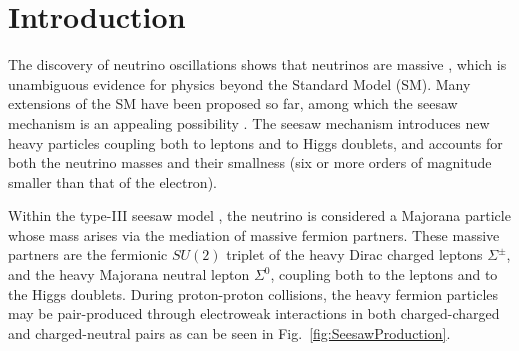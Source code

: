 \chapter{Introduction}
\label{sec:Introduction}

The discovery of neutrino oscillations shows that neutrinos are massive \cite{Nustatus}, which is unambiguous evidence for physics beyond the Standard Model (SM). Many extensions of the SM have been proposed so far, among which the seesaw mechanism is an appealing possibility \cite{SeesawI,typeIa,typeIb,typeIe,typeIIa,typeIIb,typeIIc,typeIId,typeIIe,SeesawIII:a,Seesawinverse}. The seesaw mechanism introduces new heavy particles coupling both to leptons and to Higgs doublets, and accounts for both the neutrino masses and their smallness (six or more orders of magnitude smaller than that of the electron).


Within the type-III seesaw model \cite{SeesawIII:a}, the neutrino is considered a Majorana particle whose mass arises via the mediation of massive fermion partners. These massive partners are the fermionic $SU(2)$ triplet of the heavy Dirac charged leptons $\Sigma^\pm$, and the heavy Majorana neutral lepton $\Sigma^0$, coupling both to the leptons and to the Higgs doublets. During proton-proton collisions, the heavy fermion particles may be pair-produced through electroweak interactions in both charged-charged and charged-neutral pairs as can be seen in Fig.~\ref{fig:SeesawProduction}.

